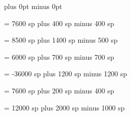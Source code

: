%
%
%





\newskip\zerowidthspace
\zerowidthspace=0pt plus 0pt minus 0pt

\newskip\interglyphspace
\interglyphspace = 7600 sp plus 400 sp minus 400 sp%

\newskip\alterationspace
\alterationspace = 8500 sp plus 1400 sp minus 500 sp%

\newskip\clefflatspace
\clefflatspace = 6000 sp plus 700 sp minus 700 sp%

\newskip\beforealterationspace
\beforealterationspace = -36000 sp plus 1200 sp minus 1200 sp%

\newskip\interelementspace
\interelementspace = 7600 sp plus 200 sp minus 400 sp%

\newskip\largerspace
\largerspace = 12000 sp plus 2000 sp minus 1000 sp%

